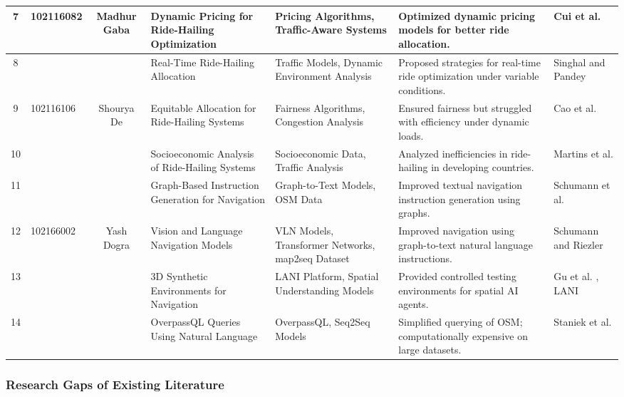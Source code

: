{\begin{longtable}{|c|p{1.75cm}|c|p{2cm}|p{2cm}|p{2cm}|p{2cm}|}
    7 & 102116082 & Madhur Gaba & Dynamic Pricing for Ride-Hailing Optimization & Pricing Algorithms, Traffic-Aware Systems & Optimized dynamic pricing models for better ride allocation. & Cui et al. \cite{cui-2022} \\ \hline
    8 &           &           & Real-Time Ride-Hailing Allocation & Traffic Models, Dynamic Environment Analysis & Proposed strategies for real-time ride optimization under variable conditions. & Singhal and Pandey \cite{singhal-2016} \\ \hline
    9 & 102116106 & Shourya De & Equitable Allocation for Ride-Hailing Systems & Fairness Algorithms, Congestion Analysis & Ensured fairness but struggled with efficiency under dynamic loads. & Cao et al. \cite{cao-2021} \\ \hline
    10 &          &           & Socioeconomic Analysis of Ride-Hailing Systems & Socioeconomic Data, Traffic Analysis & Analyzed inefficiencies in ride-hailing in developing countries. & Martins et al. \cite{martins-2024} \\ \hline
    11 &          &           & Graph-Based Instruction Generation for Navigation & Graph-to-Text Models, OSM Data & Improved textual navigation instruction generation using graphs. & Schumann et al. \cite{schumann-riezler-2021-generating} \\ \hline
    12 & 102166002 & Yash Dogra & Vision and Language Navigation Models & VLN Models, Transformer Networks, map2seq Dataset & Improved navigation using graph-to-text natural language instructions. & Schumann and Riezler \cite{schumann-riezler-2022-map2seq-vln} \\ \hline
    13 &          &           & 3D Synthetic Environments for Navigation & LANI Platform, Spatial Understanding Models & Provided controlled testing environments for spatial AI agents. & Gu et al. \cite{gu-2022}, LANI \cite{gu-2022} \\ \hline
    14 &          &           & OverpassQL Queries Using Natural Language & OverpassQL, Seq2Seq Models & Simplified querying of OSM; computationally expensive on large datasets. & Staniek et al. \cite{staniek-2024} \\ \hline
\end{longtable}
}


\subsubsection{Research Gaps of Existing Literature}


